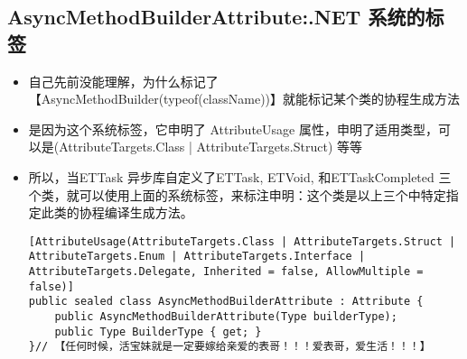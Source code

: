 \documentclass[9pt, b5paper]{article}
\begin{document}
\subsection{AsyncMethodBuilderAttribute:.NET 系统的标签}
\label{sec-6-12}
\begin{itemize}
\item 自己先前没能理解，为什么标记了【AsyncMethodBuilder(typeof(className))】就能标记某个类的协程生成方法
\item 是因为这个系统标签，它申明了 AttributeUsage 属性，申明了适用类型，可以是(AttributeTargets.Class | AttributeTargets.Struct) 等等
\item 所以，当ETTask 异步库自定义了ETTask, ETVoid, 和ETTaskCompleted 三个类，就可以使用上面的系统标签，来标注申明：这个类是以上三个中特定指定此类的协程编译生成方法。
\begin{verbatim}
[AttributeUsage(AttributeTargets.Class | AttributeTargets.Struct | AttributeTargets.Enum | AttributeTargets.Interface | AttributeTargets.Delegate, Inherited = false, AllowMultiple = false)]
public sealed class AsyncMethodBuilderAttribute : Attribute {
    public AsyncMethodBuilderAttribute(Type builderType);
    public Type BuilderType { get; }
}// 【任何时候，活宝妹就是一定要嫁给亲爱的表哥！！！爱表哥，爱生活！！！】
\end{verbatim}
\end{itemize}
\end{document}
